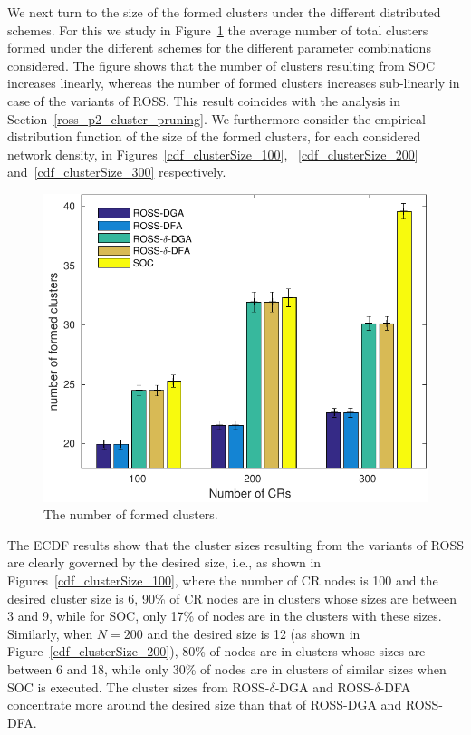 \documentclass[times]{ettauth}
\newcommand{\ie}{i.e., }
\theoremstyle{mytheoremstyle}
\theoremstyle{mytheoremstyle}
\theoremstyle{mytheoremstyle}
\begin{document}
We next turn to the size of the formed clusters under the different distributed schemes.
For this we study in Figure~\ref{nClusters_largeNetwork} the average number of total clusters formed under the different schemes for the different parameter combinations considered.
The figure shows that the number of clusters resulting from SOC increases linearly, whereas the number of formed clusters increases sub-linearly in case of the variants of ROSS.
This result coincides with the analysis in Section~\ref{ross_p2_cluster_pruning}.
We furthermore consider the empirical distribution function of the size of the formed clusters, for each considered network density, in Figures~\ref{cdf_clusterSize_100}, ~\ref{cdf_clusterSize_200} and~\ref{cdf_clusterSize_300} respectively.
\begin{figure}[!h]
  \centering
   \includegraphics[width=0.7\linewidth]{nClusters_largeNetwork_no_texture.pdf}
  \caption{The number of formed clusters.}
  \label{nClusters_largeNetwork}
\end{figure}

The ECDF results show that the cluster sizes resulting from the variants of ROSS are clearly governed by the desired size, \ie as shown in Figures~\ref{cdf_clusterSize_100}, where the number of CR nodes is 100 and the desired cluster size is 6, 90\% of CR nodes are in clusters whose sizes are between 3 and 9, while for SOC, only 17\% of nodes are in the clusters with these sizes.
Similarly, when $N=200$ and the desired size is 12 (as shown in Figure~\ref{cdf_clusterSize_200}), 80\% of nodes are in clusters whose sizes are between 6 and 18, while only 30\% of nodes are in clusters of similar sizes when SOC is executed.
The cluster sizes from ROSS-$\delta$-DGA and ROSS-$\delta$-DFA concentrate more around the desired size than that of ROSS-DGA and ROSS-DFA.
\end{document}
